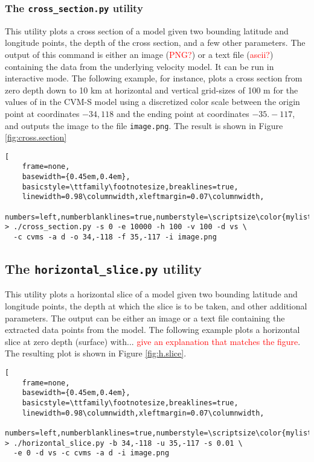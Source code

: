 \subsubsection{The \textup{\texttt{cross\_section.py}} utility}

This utility plots a cross section of a model given two bounding latitude and longitude points, the depth of the cross section, and a few other parameters. The output of this command is either an image (\textcolor{red}{PNG?}) or a text file (\textcolor{red}{ascii?}) containing the data from the underlying velocity model. It can be run in interactive mode. The following example, for instance, plots a cross section from zero depth down to 10 km at horizontal and vertical grid-sizes of 100 m for the values of \vs{} in the CVM-S model using a discretized color scale between the origin point at coordinates $-34,118$ and the ending point at coordinates $-35.-117$, and outputs the image to the file \texttt{image.png}. The result is shown in Figure \ref{fig:cross.section}

\begin{lstlisting}[
	frame=none,
	basewidth={0.45em,0.4em},
	basicstyle=\ttfamily\footnotesize,breaklines=true,
	linewidth=0.98\columnwidth,xleftmargin=0.07\columnwidth,
	numbers=left,numberblanklines=true,numberstyle=\scriptsize\color{mylistingnclr}]
> ./cross_section.py -s 0 -e 10000 -h 100 -v 100 -d vs \
  -c cvms -a d -o 34,-118 -f 35,-117 -i image.png
\end{lstlisting}



\subsection{The \textup{\texttt{horizontal\_slice.py}} utility}

This utility plots a horizontal slice of a model given two bounding latitude and longitude points, the depth at which the slice is to be taken, and other additional parameters. The output can be either an image or a text file containing the extracted data points from the model. The following example plots a horizontal slice at zero depth (surface) with... \textcolor{red}{give an explanation that matches the figure}. The resulting plot is shown in Figure \ref{fig:h.slice}.

\begin{lstlisting}[
	frame=none,
	basewidth={0.45em,0.4em},
	basicstyle=\ttfamily\footnotesize,breaklines=true,
	linewidth=0.98\columnwidth,xleftmargin=0.07\columnwidth,
	numbers=left,numberblanklines=true,numberstyle=\scriptsize\color{mylistingnclr}]
> ./horizontal_slice.py -b 34,-118 -u 35,-117 -s 0.01 \
  -e 0 -d vs -c cvms -a d -i image.png
\end{lstlisting}

